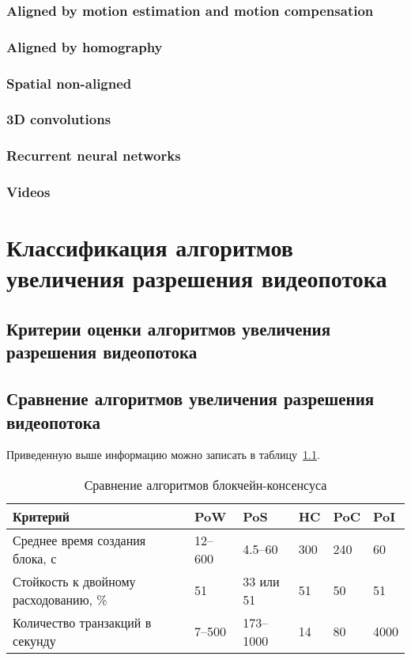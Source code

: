 \documentclass{bmstu}
\begin{document}
\subsection{Aligned by motion estimation and motion compensation}

\subsection{Aligned by homography}

\subsection{Spatial non-aligned}

\subsection{3D convolutions}

\subsection{Recurrent neural networks}

\subsection{Videos}

\chapter{Классификация алгоритмов увеличения разрешения видеопотока}

\section{Критерии оценки алгоритмов увеличения разрешения видеопотока}

\section{Сравнение алгоритмов увеличения разрешения видеопотока}

Приведенную выше информацию можно записать в таблицу~\ref{tabular:comparison}. 

\begin{table}[H]
\caption{Сравнение алгоритмов блокчейн-консенсуса}
\label{tabular:comparison}
\begin{tabular}{|p{3cm}|p{2cm}|p{2.4cm}|p{}|p{}|p{}|}
\hline
\textbf{Критерий} & \textbf{PoW} & \textbf{PoS} & \textbf{HC} & \textbf{PoC} & \textbf{PoI}
\tabularnewline
\hline
Среднее время создания блока, с & 12--600 & 4.5--60 & 300 & 240 & 60
\tabularnewline
\hline
Стойкость к двойному расходованию, \% & 51 & 33 или 51 & 51 & 50 & 51
\tabularnewline
\hline
Количество транзакций в секунду & 7--500 & 173--1000 & 14 & 80 & 4000
\tabularnewline
\hline
\end{tabular}
\end{table}
\end{document}
